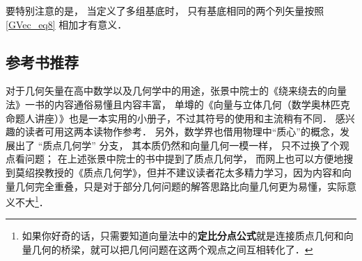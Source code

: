 要特别注意的是， 当定义了多组基底时， 只有基底相同的两个列矢量按照\autoref{GVec_eq8} 相加才有意义．

\subsection{参考书推荐}
对于几何矢量在高中数学以及几何学中的用途，张景中院士的《绕来绕去的向量法》一书的内容通俗易懂且内容丰富， 单墫的《向量与立体几何（数学奥林匹克命题人讲座）》也是一本实用的小册子，不过其符号的使用和主流稍有不同． 感兴趣的读者可用这两本读物作参考． 另外，数学界也借用物理中“质心”的概念，发展出了 “质点几何学” 分支， 其本质仍然和向量几何一模一样， 只不过换了个观点看问题； 在上述张景中院士的书中提到了质点几何学， 而网上也可以方便地搜到莫绍揆教授的《质点几何学》，但并不建议读者花太多精力学习，因为内容和向量几何完全重叠，只是对于部分几何问题的解答思路比向量几何更为易懂，实际意义不大\footnote{如果你好奇的话，只需要知道向量法中的\textbf{定比分点公式}就是连接质点几何和向量几何的桥梁，就可以把几何问题在这两个观点之间互相转化了．}．
